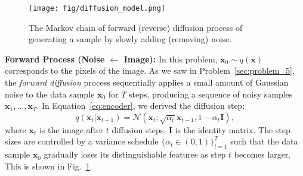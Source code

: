 \documentclass[11pt,addpoints,answers]{exam}
\newcommand{\xv}{\mathbf{x}}
\begin{document}
\begin{questions}
    \begin{figure}[h!]
        \centering
        \texttt{[image: fig/diffusion\_model.png]}
        \caption{The Markov chain of forward (reverse) diffusion process of generating a sample by slowly adding (removing) noise.}
        \label{fig:diffusion}
    \end{figure}


    \textbf{Forward Process (Noise $\leftarrow$ Image):} 
    In this problem, $\xv_0 \sim q(\xv)$ corresponds to the pixels of the image. As we saw in Problem~\ref{sec:problem_5}, the \textit{forward diffusion} process  sequentially applies a small amount of Gaussian noise to the data sample $\xv_0$ for \( T \) steps, producing a sequence of noisy samples \( \xv_1, \ldots, \xv_T \).
    In Equation~\ref{eq:encoder}, we derived the diffusion step:
    \begin{equation}
        q(\xv_t | \xv_{t-1}) = \mathcal{N}(\xv_t; \sqrt{\alpha_t}\xv_{t-1}, 1-\alpha_t \boldsymbol{I}),
    \end{equation}
    where $\xv_t$ is the image after $t$ diffusion steps, $\boldsymbol{I}$ is the identity matrix.
    The step sizes are controlled by a variance schedule \( \{\alpha_t \in (0,1)\}_{t=1}^T \) such that the data sample \( \xv_0 \) gradually loses its distinguishable features as step \( t \) becomes larger. This is shown in Fig.~\ref{fig:diffusion}.
    \par


\end{questions}
\end{document}
